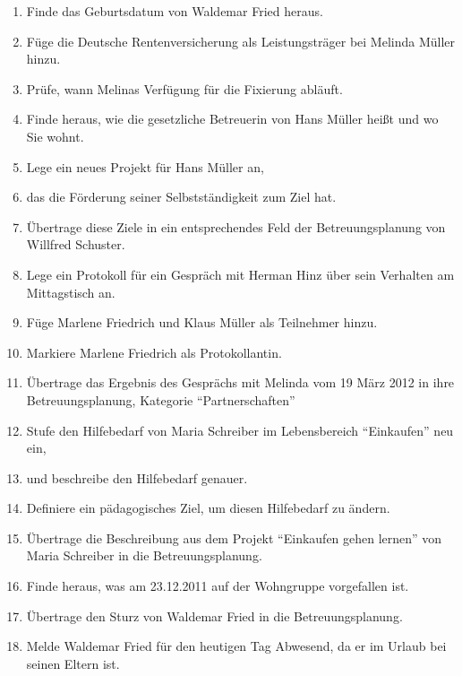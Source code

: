 \begin{description}
        \begin{enumerate}
		\item Finde das Geburtsdatum von Waldemar Fried heraus. 
		\item Füge die Deutsche Rentenversicherung als Leistungsträger bei Melinda Müller hinzu.
		\item Prüfe, wann Melinas Verfügung für die Fixierung abläuft.
		\item Finde heraus, wie die gesetzliche Betreuerin von Hans Müller heißt und wo Sie wohnt.
		\item Lege ein neues Projekt für Hans Müller an, 
		\item das die Förderung seiner Selbstständigkeit zum Ziel hat.
		\item Übertrage diese Ziele in ein entsprechendes Feld der Betreuungsplanung von Willfred Schuster.
		\item Lege ein Protokoll für ein Gespräch mit Herman Hinz über sein Verhalten am Mittagstisch an.
		\item Füge Marlene Friedrich und Klaus Müller als Teilnehmer hinzu.
		\item Markiere Marlene Friedrich als Protokollantin.
		\item Übertrage das Ergebnis des Gesprächs mit Melinda vom 19 März 2012 in ihre Betreuungsplanung, Kategorie ``Partnerschaften''
		\item Stufe den Hilfebedarf von Maria Schreiber im Lebensbereich ``Einkaufen'' neu ein,
		\item und beschreibe den Hilfebedarf genauer.
		\item Definiere ein pädagogisches Ziel, um diesen Hilfebedarf zu ändern.
		\item Übertrage die Beschreibung aus dem Projekt ``Einkaufen gehen lernen'' von Maria Schreiber in die Betreuungsplanung.
		\item Finde heraus, was am 23.12.2011 auf der Wohngruppe vorgefallen ist.
		\item Übertrage den Sturz von Waldemar Fried in die Betreuungsplanung.
		\item Melde Waldemar Fried für den heutigen Tag Abwesend, da er im Urlaub bei seinen Eltern ist.
        \end{enumerate}

\end{description}

